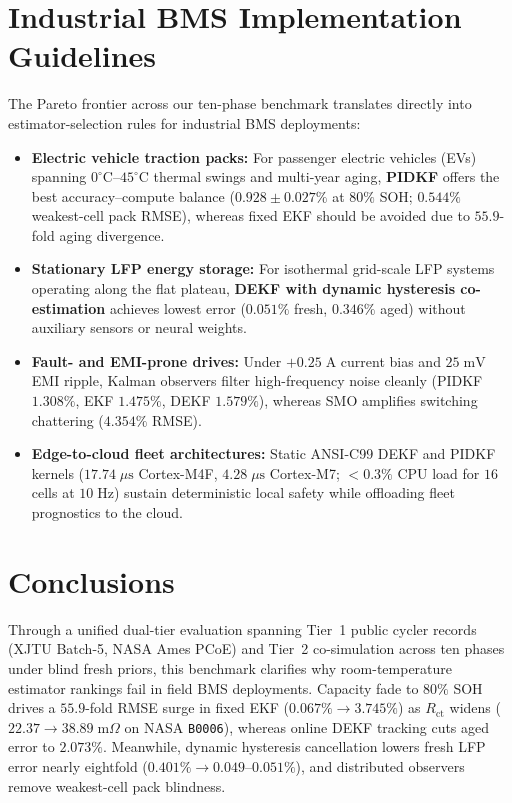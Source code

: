 \documentclass[10pt,a4paper]{article}
\providecommand{\upmu}{\mu}
\begin{document}
\section{Industrial BMS Implementation Guidelines}
The Pareto frontier across our ten-phase benchmark translates directly into estimator-selection rules for industrial BMS deployments:
\begin{itemize}
\item \textbf{Electric vehicle traction packs:} For passenger electric vehicles (EVs) spanning $0^\circ\text{C}\text{--}45^\circ\text{C}$ thermal swings and multi-year aging, \textbf{PIDKF} offers the best accuracy--compute balance ($0.928\pm0.027\%$ at $80\%$ SOH; $0.544\%$ weakest-cell pack RMSE), whereas fixed EKF should be avoided due to $55.9$-fold aging divergence.
\item \textbf{Stationary LFP energy storage:} For isothermal grid-scale LFP systems operating along the flat plateau, \textbf{DEKF with dynamic hysteresis co-estimation} achieves lowest error ($0.051\%$ fresh, $0.346\%$ aged) without auxiliary sensors or neural weights.
\item \textbf{Fault- and EMI-prone drives:} Under $+0.25\;\mathrm{A}$ current bias and $25\;\mathrm{mV}$ EMI ripple, Kalman observers filter high-frequency noise cleanly (PIDKF $1.308\%$, EKF $1.475\%$, DEKF $1.579\%$), whereas SMO amplifies switching chattering ($4.354\%$ RMSE).
\item \textbf{Edge-to-cloud fleet architectures:} Static ANSI-C99 DEKF and PIDKF kernels ($17.74\;\upmu\mathrm{s}$ Cortex-M4F, $4.28\;\upmu\mathrm{s}$ Cortex-M7; $<0.3\%$ CPU load for $16$ cells at $10\;\mathrm{Hz}$) sustain deterministic local safety while offloading fleet prognostics to the cloud.
\end{itemize}

\section{Conclusions}
Through a unified dual-tier evaluation spanning Tier~1 public cycler records (XJTU Batch-5, NASA Ames PCoE) and Tier~2 co-simulation across ten phases under blind fresh priors, this benchmark clarifies why room-temperature estimator rankings fail in field BMS deployments. Capacity fade to $80\%$ SOH drives a $55.9$-fold RMSE surge in fixed EKF ($0.067\% \rightarrow 3.745\%$) as $R_{\text{ct}}$ widens ($22.37 \rightarrow 38.89\;\mathrm{m}\Omega$ on NASA \texttt{B0006}), whereas online DEKF tracking cuts aged error to $2.073\%$. Meanwhile, dynamic hysteresis cancellation lowers fresh LFP error nearly eightfold ($0.401\% \rightarrow 0.049\text{--}0.051\%$), and distributed observers remove weakest-cell pack blindness.
\end{document}
